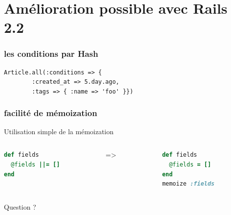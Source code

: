 \documentclass{beamer}
\begin{document}
\section{Amélioration possible avec Rails 2.2}

\begin{frame}[fragile]
    \frametitle{les conditions par Hash}
    \begin{lstlisting}[Language=Ruby]
Article.all(:conditions => { 
        :created_at => 5.day.ago,
        :tags => { :name => 'foo' }})
    \end{lstlisting}
\end{frame}

\begin{frame}[fragile]
    \frametitle{facilité de mémoization}
    Utilisation simple de la mémoization
    \begin{columns}
        \begin{column}[l]{4cm}
            \begin{lstlisting}[language=Ruby, frame=single]
def fields
  @fields ||= []
end
            \end{lstlisting}
        \end{column}
        \begin{column}[c]{1cm}
         =>
        \end{column}
        \begin{column}[r]{4cm}
            \begin{lstlisting}[language=Ruby, frame=single]
def fields
  @fields = []
end
memoize :fields
            \end{lstlisting}
        \end{column}
    \end{columns}

\end{frame}

\begin{frame}
    \begin{center}
    \huge{}
    Question ?
    \end{center}
\end{frame}
\end{document}
